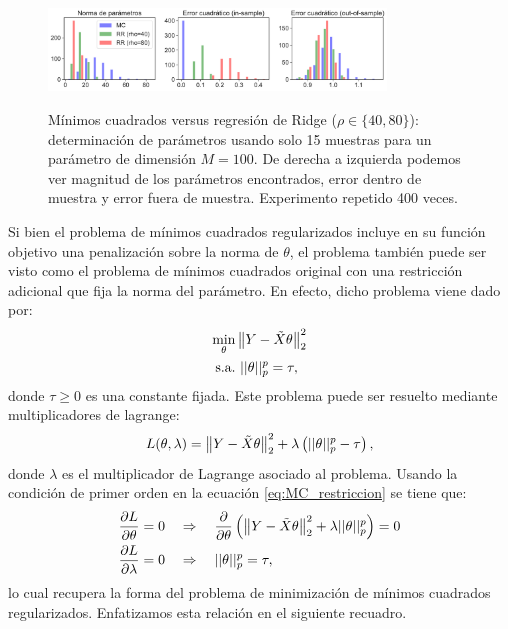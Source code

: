  \begin{figure}[H]
	\centering
	\includegraphics[width=0.8\textwidth]{img/cap2_bias-variance.pdf}\\
	\caption{Mínimos cuadrados versus regresión de Ridge ($\rho\in\{40,80\}$): determinación de parámetros usando solo 15 muestras para un parámetro de dimensión $M=100$. De derecha a izquierda podemos ver magnitud de los parámetros encontrados, error dentro de muestra y error fuera de muestra. Experimento repetido 400 veces.}
	\label{fig:MCvsRR_Synth}  
\end{figure}

Si bien el problema de mínimos cuadrados regularizados incluye en su función objetivo una penalización sobre la norma de $\theta$, el problema también puede ser visto como el problema de mínimos cuadrados original con una restricción adicional que fija la norma del parámetro. En efecto, dicho problema viene dado por:
\begin{align}
	\min_\theta & \left\lVert Y-\tilde{X}\theta\right\rVert_2^2\label{eq:dual_MCR1}\\
	\text{s.a.} &\ ||\theta||_p^p = \tau,\label{eq:dual_MCR2}
\end{align}
donde $\tau\geq0$ es una constante fijada. Este problema puede ser resuelto mediante multiplicadores de lagrange:
\begin{equation}
	L(\theta,\lambda) = \left\lVert Y-\tilde{X}\theta\right\rVert_2^2 + \lambda \left(||\theta||_p^p - \tau\right),
	\label{eq:MC_restriccion}
\end{equation}
donde $\lambda$ es el multiplicador de Lagrange asociado al problema. Usando la condición de primer orden en la ecuación \eqref{eq:MC_restriccion} se tiene que: 
\begin{align}
	\frac{\partial L}{\partial \theta} = 0 &\quad\Rightarrow\quad  \frac{\partial }{\partial \theta}\left(\left\lVert Y-\tilde{X}\theta\right\rVert_2^2 + \lambda ||\theta||_p^p \right) = 0\\
	\frac{\partial L}{\partial \lambda} = 0 &\quad\Rightarrow\quad ||\theta||_p^p = \tau,
\end{align}
lo cual recupera la forma del problema de minimización de mínimos cuadrados regularizados. Enfatizamos esta relación en el siguiente recuadro. 

